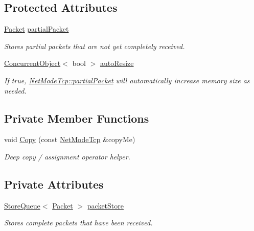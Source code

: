 \subsection*{Protected Attributes}
\begin{DoxyCompactItemize}
\item 
\hyperlink{class_packet}{Packet} \hyperlink{class_net_mode_tcp_a1f20ef5cfc101a9e3a55bbbcbadaf899}{partialPacket}
\begin{DoxyCompactList}\small\item\em Stores partial packets that are not yet completely received. \item\end{DoxyCompactList}\item 
\hyperlink{class_concurrent_object}{ConcurrentObject}$<$ bool $>$ \hyperlink{class_net_mode_tcp_ae1bb51196acb2d71e38ce60b0860a1fc}{autoResize}
\begin{DoxyCompactList}\small\item\em If true, \hyperlink{class_net_mode_tcp_a1f20ef5cfc101a9e3a55bbbcbadaf899}{NetModeTcp::partialPacket} will automatically increase memory size as needed. \item\end{DoxyCompactList}\end{DoxyCompactItemize}
\subsection*{Private Member Functions}
\begin{DoxyCompactItemize}
\item 
void \hyperlink{class_net_mode_tcp_a8f0ec4087b396e5363f6a233d2e12e37}{Copy} (const \hyperlink{class_net_mode_tcp}{NetModeTcp} \&copyMe)
\begin{DoxyCompactList}\small\item\em Deep copy / assignment operator helper. \item\end{DoxyCompactList}\end{DoxyCompactItemize}
\subsection*{Private Attributes}
\begin{DoxyCompactItemize}
\item 
\hypertarget{class_net_mode_tcp_a0571ffe9a67f99a1c69af04b906e05b6}{
\hyperlink{class_store_queue}{StoreQueue}$<$ \hyperlink{class_packet}{Packet} $>$ \hyperlink{class_net_mode_tcp_a0571ffe9a67f99a1c69af04b906e05b6}{packetStore}}
\label{class_net_mode_tcp_a0571ffe9a67f99a1c69af04b906e05b6}

\begin{DoxyCompactList}\small\item\em Stores complete packets that have been received. \item\end{DoxyCompactList}\end{DoxyCompactItemize}


